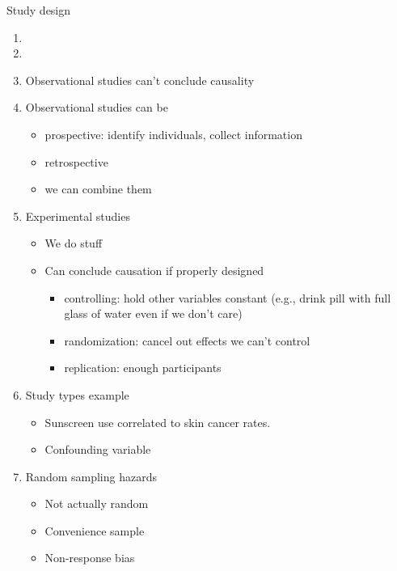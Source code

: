 Study design
\begin{enumerate}
\item {}
\item {}
\item Observational studies can't conclude causality
\item Observational studies can be
  \begin{itemize}
  \item prospective: identify individuals, collect information
  \item retrospective
  \item we can combine them
  \end{itemize}
\item Experimental studies
  \begin{itemize}
  \item We do stuff
  \item Can conclude causation if properly designed
    \begin{itemize}
    \item controlling: hold other variables constant (e.g., drink pill
      with full glass of water even if we don't care)
    \item randomization: cancel out effects we can't control
    \item replication: enough participants
    \end{itemize}
  \end{itemize}
\item Study types example
  \begin{itemize}
  \item Sunscreen use correlated to skin cancer rates.
  \item Confounding variable
  \end{itemize}
\item Random sampling hazards
  \begin{itemize}
  \item Not actually random
  \item Convenience sample
  \item Non-response bias
  \end{itemize}
\end{enumerate}

